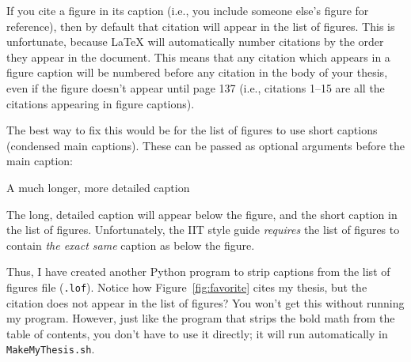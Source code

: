 \documentclass{iitthesis}
\begin{document}
If you cite a figure in its caption (i.e., you include someone else's figure for reference), 
then by default that citation will appear in the list of figures.
This is unfortunate, because \LaTeX{} will automatically number
citations by the order they appear in the document.
This means that any citation which appears in a figure caption
will be numbered before any citation in the body of your thesis, 
even if the figure doesn't appear until page 137
(i.e., citations 1--15 are all the citations appearing in figure captions).

The best way to fix this would be for the list of figures to use 
short captions (condensed main captions). These can be passed as 
optional arguments before the main caption:

\begin{verb}
	\caption[Short caption]{A much longer, more detailed caption}
\end{verb}

\noindent
The long, detailed caption will appear below the figure, 
and the short caption in the list of figures. 
Unfortunately, the IIT style guide \emph{requires} the list of figures to contain
\emph{the exact same} caption as below the figure.

Thus, I have created another Python program to strip captions from the 
list of figures file ({\tt .lof}). Notice how Figure~\ref{fig:favorite}
cites my thesis, but the citation does not appear in the list of figures?
You won't get this without running my program. However, 
just like the program that strips the bold math from the table of contents,
you don't have to use it directly; it will run automatically in {\tt MakeMyThesis.sh}.


\end{document}

